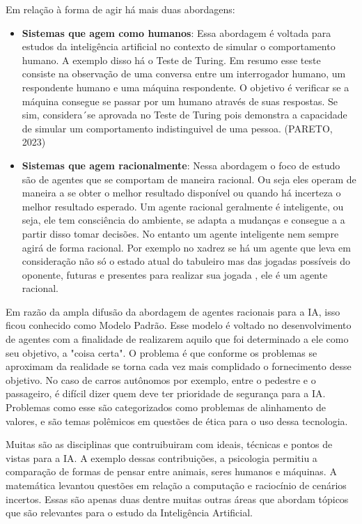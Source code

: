 \documentclass[a4paper,12pt]{article}
\begin{document}
Em relação à forma de agir há mais duas abordagens:

\begin{itemize}
    \item \textbf{Sistemas que agem como humanos}: Essa abordagem é voltada para estudos da inteligência artificial no contexto de simular o comportamento humano. A exemplo disso há o Teste de Turing. Em resumo esse teste consiste na observação de uma conversa entre um interrogador humano, um respondente humano e uma máquina respondente. O objetivo é verificar se a máquina consegue se passar por um humano através de suas respostas. Se sim, considera´se aprovada no Teste de Turing pois demonstra a capacidade de simular um comportamento indistinguivel de uma pessoa. (PARETO, 2023)

    
    \item \textbf{Sistemas que agem racionalmente}: Nessa abordagem o foco de estudo são de agentes que se comportam de maneira racional. Ou seja eles operam de maneira a se obter o melhor resultado disponível ou quando há incerteza o melhor resultado esperado. Um agente racional geralmente é inteligente, ou seja, ele tem consciência do ambiente, se adapta a mudanças e consegue a a partir disso tomar decisões. No entanto um agente inteligente nem sempre agirá de forma racional. Por exemplo no xadrez se há um agente que leva em consideração não só o estado atual do tabuleiro mas das jogadas possíveis do oponente, futuras e presentes para realizar sua jogada , ele é um agente racional.
    
\end{itemize}

Em razão da ampla difusão da abordagem de agentes racionais para a IA, isso ficou conhecido como Modelo Padrão. Esse modelo é voltado no desenvolvimento de agentes com a finalidade de realizarem aquilo que foi determinado a ele como seu objetivo, a "coisa certa". O problema é que conforme os problemas se aproximam da realidade se torna cada vez mais complidado o fornecimento desse objetivo. No caso de carros autônomos por exemplo, entre o pedestre e o passageiro, é difícil dizer quem deve ter prioridade de segurança para a IA. Problemas como esse são categorizados como problemas de alinhamento de valores, e são temas polêmicos em questões de ética para o uso dessa tecnologia.

Muitas são as disciplinas que contruibuiram com ideais, técnicas e pontos de vistas para a IA. A exemplo dessas contribuições, a psicologia permitiu a comparação de formas de pensar entre animais, seres humanos e máquinas. A matemática levantou questões em relação a computação e raciocínio de cenários incertos. Essas são apenas duas dentre muitas outras áreas que abordam tópicos que são relevantes para o estudo da Inteligência Artificial.
\end{document}
